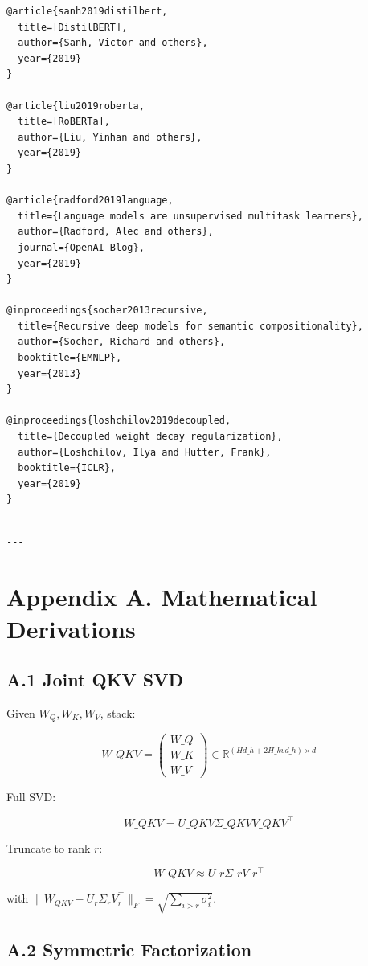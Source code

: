\begin{lstlisting}
@article{sanh2019distilbert,
  title=[DistilBERT],
  author={Sanh, Victor and others},
  year={2019}
}

@article{liu2019roberta,
  title=[RoBERTa],
  author={Liu, Yinhan and others},
  year={2019}
}

@article{radford2019language,
  title={Language models are unsupervised multitask learners},
  author={Radford, Alec and others},
  journal={OpenAI Blog},
  year={2019}
}

@inproceedings{socher2013recursive,
  title={Recursive deep models for semantic compositionality},
  author={Socher, Richard and others},
  booktitle={EMNLP},
  year={2013}
}

@inproceedings{loshchilov2019decoupled,
  title={Decoupled weight decay regularization},
  author={Loshchilov, Ilya and Hutter, Frank},
  booktitle={ICLR},
  year={2019}
}
\end{lstlisting}
\begin{lstlisting}

---
\end{lstlisting}

\section{Appendix A. Mathematical Derivations}

\subsection{A.1 Joint QKV SVD}

Given $W_Q, W_K, W_V$, stack:

\[
W\_{QKV} = \begin{pmatrix} W\_Q \\ W\_K \\ W\_V \end{pmatrix} \in \mathbb{R}^{(H d\_h + 2 H\_{kv} d\_h) \times d}
\]

Full SVD:

\[
W\_{QKV} = U\_{QKV} \Sigma\_{QKV} V\_{QKV}^\top
\]

Truncate to rank $r$:

\[
W\_{QKV} \approx U\_r \Sigma\_r V\_r^\top
\]

with $\|W_{QKV} - U_r \Sigma_r V_r^\top\|_F = \sqrt{\sum_{i > r} \sigma_i^2}$.

\subsection{A.2 Symmetric Factorization}


